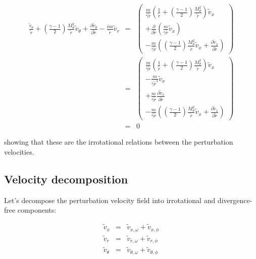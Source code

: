 \documentclass[12pt]{article}
\begin{document}
\begin{eqnarray}
\frac{  \widetilde{v}_{\theta}}{\widetilde{r}}
+ 
\left(\frac{\gamma-1}{2} \right)
\frac{M_{\theta}^2}{\widetilde{r}}
\widetilde{v}_{\theta}
+
\frac{\partial \widetilde{v}_{\theta}}{\partial \widetilde{r}} 
-\frac{i m}{\widetilde{r}}
\widetilde{v}_r
&=&
\left(
\begin{array}{r}
\frac{m}{\overline{\gamma}\widetilde{r}}
\left(
\frac{1}{\widetilde{r}}
+ 
\left(\frac{\gamma-1}{2} \right)
\frac{M_{\theta}^2}{\widetilde{r}}
\right)
\widetilde{v}_{x}
\\
+
\frac{\partial }{\partial \widetilde{r}} 
\left(
\frac{m}{\overline{\gamma} \widetilde{r}} \widetilde{v}_{x}
\right)
\\
-\frac{ m}
{ \overline{\gamma}
\widetilde{r}}
\left(
\left(\frac{\gamma-1}{2} \right)
\frac{M_{\theta}^2}{\widetilde{r}}
\widetilde{v}_x
+
\frac{\partial \widetilde{v}_x}{\partial \widetilde{r}} 
\right)
\end{array}
\right)
\nonumber
\\
&=&
\left(
\begin{array}{r}
\frac{m}{\overline{\gamma}\widetilde{r}}
\left(
\frac{1}{\widetilde{r}}
+ 
\left(\frac{\gamma-1}{2} \right)
\frac{M_{\theta}^2}{\widetilde{r}}
\right)
\widetilde{v}_{x}
\\
-
\frac{m}{\overline{\gamma} \widetilde{r}^2} \widetilde{v}_{x}
\\
+
\frac{m}{\overline{\gamma} \widetilde{r}} 
\frac{\partial \widetilde{v}_{x}
 }{\partial \widetilde{r}} 
\\
-\frac{ m}
{ \overline{\gamma}
\widetilde{r}}
\left(
\left(\frac{\gamma-1}{2} \right)
\frac{M_{\theta}^2}{\widetilde{r}}
\widetilde{v}_x
+
\frac{\partial \widetilde{v}_x}{\partial \widetilde{r}} 
\right)
\end{array}
\right)
\nonumber
\\
&=& 0
\nonumber
\end{eqnarray}

showing that these are the irrotational relations between the
perturbation velocities.

\subsection{Velocity decomposition}

Let's decompose the perturbation velocity field into
irrotational and divergence-free components:

\begin{eqnarray}
\widetilde{v}_x &=& 
\widetilde{v}_{x,\omega}
+\widetilde{v}_{x,\phi}
\nonumber
\\
\widetilde{v}_r &=& 
\widetilde{v}_{r,\omega}
+\widetilde{v}_{r,\phi}
\nonumber
\\
\widetilde{v}_{\theta} &=& 
\widetilde{v}_{\theta,\omega}
+\widetilde{v}_{\theta,\phi}
\nonumber
\end{eqnarray}
\end{document}
